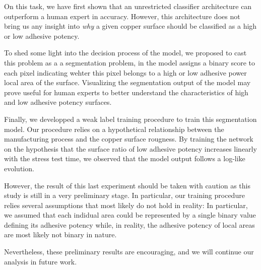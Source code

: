 \documentclass[10pt,twocolumn,letterpaper]{article}
\begin{document}
On this task, we have first shown that an unrestricted classifier 
architecture can outperform a human expert in accuracy.
However, this architecture does not bring us any insight 
into \textit{why} a given copper surface should be classified 
as a high or low adhesive potency.

To shed some light into the decision process of the model,
we proposed to cast this problem as a a segmentation problem, 
in the model assigns a binary score to each pixel indicating wehter this
pixel belongs to a high or low adhesive power local area of the surface.
Visualizing the segmentation output of the model may prove useful for 
human experts to better understand the characteristics of high and low 
adhesive potency surfaces.

Finally, we developped a weak label training procedure to train this segmentation model.
Our procedure relies on a hypothetical relationship between the manufacturing process and the
copper surface rougness.
By training the network on the hypothesis that the surface ratio of low adhesive potency increases
linearly with the stress test time, we observed that the model output follows a log-like evolution.

However, the result of this last experiment should be taken with caution as this study is still in a very preliminary stage.
In particular, our training procedure relies several assumptions that most likely do not hold in reality: 
In particular, we assumed that each indidual area could be represented by a single binary value defining its adhesive potency
while, in reality, the adhesive potency of local areas are most likely not binary in nature.

Nevertheless, these preliminary results are encouraging, and we will continue our analysis in future work.


{\small


}
\end{document}
